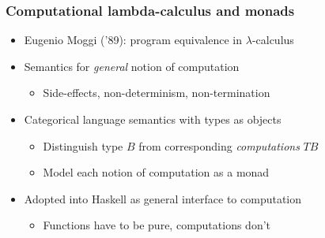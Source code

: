 \begin{frame}[fragile]
\frametitle{Computational lambda-calculus and monads}
\begin{itemize}
    \item Eugenio Moggi ('89): program equivalence in $\lambda$-calculus
    \item Semantics for \emph{general} notion of computation
          \begin{itemize}
              \item Side-effects, non-determinism, non-termination
          \end{itemize}
    \item Categorical language semantics with types as objects
          \begin{itemize}
              \item Distinguish type $B$ from corresponding \emph{computations} $TB$
              \item Model each notion of computation as a monad
          \end{itemize}
    \item Adopted into Haskell as general interface to computation
          \begin{itemize}
              \item Functions have to be pure, computations don't
          \end{itemize}
\end{itemize}
\end{frame}
